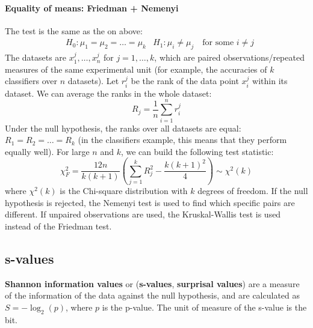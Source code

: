 \paragraph{Equality of means: Friedman + Nemenyi}
The test is the same as the on above:
\begin{align*}
    &H_0 : \mu_1 = \mu_2 = \ldots = \mu_k &H_1 : \mu_i \not = \mu_j \quad \text{for some } i \not = j
\end{align*}
The datasets are $x_1^j, \ldots, x_n^j$ for $j=1, \ldots, k$, which are paired observations/repeated measures of the same experimental unit (for example, the accuracies of $k$ classifiers over $n$  datasets). Let $r_i^j$ be the rank of the data point $x_i^j$ within its dataset. We can average the ranks in the whole dataset:
\begin{equation*}
    R_j = \frac{1}{n} \sum_{i=1}^n r_i^j
\end{equation*}
Under the null hypothesis, the ranks over all datasets are equal: $R_1 = R_2 = \ldots = R_k$ (in the classifiers example, this means that they perform equally well). For large $n$ and $k$, we can build the following test statistic:
\begin{equation*}
    \chi_F^2 = \frac{12 n}{k(k+1)} \left( \sum_{j=1}^k  R_j^2 - \frac{k(k+1)^2}{4} \right) \sim \chi^2(k)
\end{equation*}
where $\chi^2(k)$ is the Chi-square distribution with $k$ degrees of freedom.
If the null hypothesis is rejected, the Nemenyi test is used to find which specific pairs are different. If unpaired observations are used, the Kruskal-Wallis test is used instead of the Friedman test.

\subsection{s-values}
\textbf{Shannon information values} or (\textbf{s-values}, \textbf{surprisal values}) are a measure of the information of the data against the null hypothesis, and are calculated as $S = -\log_2(p)$, where $p$ is the p-value. The unit of measure of the s-value is the bit.

